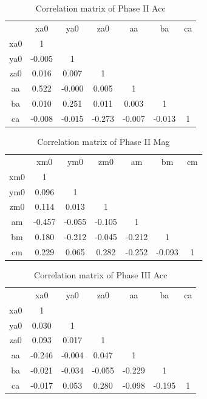 \begin{table}
    \centering
    \begin{tabular}{c|c|c|c|c|c|c}
             &   xa0  &   ya0  &   za0  &   aa   &   ba   & ca \\
         xa0 &  1     &        &        &        &        &    \\
         ya0 & -0.005 &  1     &        &        &        &    \\
         za0 &  0.016 &  0.007 &  1     &        &        &    \\
         aa  &  0.522 & -0.000 &  0.005 &  1     &        &    \\
         ba  &  0.010 &  0.251 &  0.011 &  0.003 &  1     &    \\
         ca  & -0.008 & -0.015 & -0.273 & -0.007 & -0.013 &  1 \\
    \end{tabular}
    \caption{Correlation matrix of Phase II Acc}
\end{table}

\begin{table}
    \centering
    \begin{tabular}{c|c|c|c|c|c|c}
             &   xm0  & ym0    &   zm0  &   am   &   bm   & cm \\
         xm0 &  1     &        &        &        &        &    \\
         ym0 &  0.096 &  1     &        &        &        &    \\
         zm0 &  0.114 &  0.013 &  1     &        &        &    \\
         am  & -0.457 & -0.055 & -0.105 &  1     &        &    \\
         bm  &  0.180 & -0.212 & -0.045 & -0.212 &  1     &    \\
         cm  &  0.229 &  0.065 &  0.282 & -0.252 & -0.093 & 1  \\
    \end{tabular}
    \caption{Correlation matrix of Phase II Mag}
\end{table}

\begin{table}
    \centering
    \begin{tabular}{c|c|c|c|c|c|c}
             &   xa0  &   ya0  &   za0  &   aa   &   ba   & ca \\
         xa0 &  1     &        &        &        &        &    \\
         ya0 &  0.030 &  1     &        &        &        &    \\
         za0 &  0.093 &  0.017 &  1     &        &        &    \\
         aa  & -0.246 & -0.004 &  0.047 &  1     &        &    \\
         ba  & -0.021 & -0.034 & -0.055 & -0.229 &  1     &    \\
         ca  & -0.017 &  0.053 &  0.280 & -0.098 & -0.195 &  1 \\
    \end{tabular}
    \caption{Correlation matrix of Phase III Acc}
    \label{tab:my_label}
\end{table}

